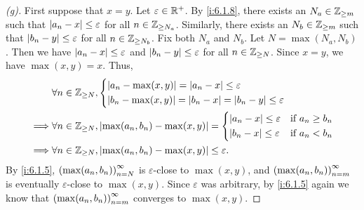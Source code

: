 \begin{proof}[(g)]
  First suppose that \(x = y\).
  Let \(\varepsilon \in \mathbb{R}^+\).
  By \cref{i:6.1.8}, there exists an \(N_a \in \mathbb{Z}_{\geq m}\) such that \(\left\lvert a_n - x\right\rvert \leq \varepsilon\) for all \(n \in \mathbb{Z}_{\geq N_a}\).
  Similarly, there exists an \(N_b \in \mathbb{Z}_{\geq m}\) such that \(\left\lvert b_n - y\right\rvert \leq \varepsilon\) for all \(n \in \mathbb{Z}_{\geq N_b}\).
  Fix both \(N_a\) and \(N_b\).
  Let \(N = \max(N_a, N_b)\).
  Then we have \(\left\lvert a_n - x\right\rvert \leq \varepsilon\) and \(\left\lvert b_n - y\right\rvert \leq \varepsilon\) for all \(n \in \mathbb{Z}_{\geq N}\).
  Since \(x = y\), we have \(\max(x, y) = x\).
  Thus,
  \begin{align*}
             & \forall n \in \mathbb{Z}_{\geq N}, \begin{dcases}
                                            \left\lvert a_n - \max(x, y)\right\rvert = \left\lvert a_n - x\right\rvert \leq \varepsilon \\
                                            \left\lvert b_n - \max(x, y)\right\rvert = \left\lvert b_n - x\right\rvert = \left\lvert b_n - y\right\rvert \leq \varepsilon
                                          \end{dcases}                       \\
    \implies & \forall n \in \mathbb{Z}_{\geq N}, \left\lvert\max(a_n, b_n) - \max(x, y)\right\rvert = \begin{dcases}
                                                                                \left\lvert a_n - x\right\rvert \leq \varepsilon & \text{if } a_n \geq b_n \\
                                                                                \left\lvert b_n - x\right\rvert \leq \varepsilon & \text{if } a_n < b_n
                                                                              \end{dcases} \\
    \implies & \forall n \in \mathbb{Z}_{\geq N}, \left\lvert\max(a_n, b_n) - \max(x, y)\right\rvert \leq \varepsilon.
  \end{align*}
  By \cref{i:6.1.5}, \(\left\lparen\max(a_n, b_n)\right\rparen_{n = N}^\infty\) is \(\varepsilon\)-close to \(\max(x, y)\), and \(\left\lparen\max(a_n, b_n)\right\rparen_{n = m}^\infty\) is eventually \(\varepsilon\)-close to \(\max(x, y)\).
  Since \(\varepsilon\) was arbitrary, by \cref{i:6.1.5} again we know that \(\left\lparen\max(a_n, b_n)\right\rparen_{n = m}^\infty\) converges to \(\max(x, y)\).


\end{proof}
